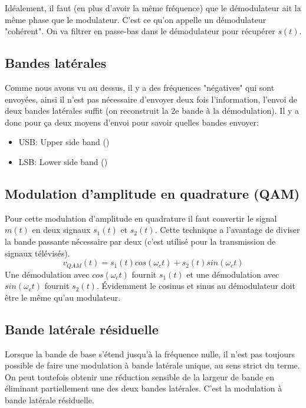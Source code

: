 Idéalement, il faut (en plus d'avoir la même fréquence) que le démodulateur ait la même phase que le modulateur. C'est ce qu'on appelle un démodulateur "cohérent". On va filtrer en passe-bas dans le démodulateur pour récupérer $s(t)$.

\subsection{Bandes latérales}

Comme nous avons vu au dessus, il y a des fréquences "négatives" qui sont envoyées, ainsi il n'est pas nécessaire d'envoyer deux fois l'information, l'envoi de deux bandes latérales suffit (on reconstruit la 2e bande à la démodulation). Il y a donc pour ça deux moyens d'envoi pour savoir quelles bandes envoyer:
\begin{itemize}
  \item USB: Upper side band ()
  \item LSB: Lower side band ()
\end{itemize}

\subsection{Modulation d'amplitude en q\-uadrature (QAM)}

Pour cette modulation d'amplitude en quadrature il faut convertir le signal $m(t)$ en deux signaux $s_1(t)$ et $s_2(t)$. Cette technique a l'avantage de diviser la bande passante nécessaire par deux (c'est utilisé pour la transmission de signaux télévisés).
\begin{equation*}
v_{QAM}(t) = s_1(t) cos(\omega_c t) + s_2(t) sin(\omega_c t)
\end{equation*}
Une démodulation avec $cos(\omega_c t)$ fournit $s_1(t)$ et une démodulation avec $sin(\omega_c t)$ fournit $s_2(t)$. Évidemment le cosinus et sinus au démodulateur doit être le même qu'au modulateur.

\subsection{Bande latérale résiduelle}

Lorsque la bande de base s'étend jusqu'à la fréquence nulle, il n'est pas toujours possible de faire une modulation à bande latérale unique, au sens strict du terme. On peut toutefois obtenir une réduction sensible de la largeur de bande en éliminant partiellement une des deux bandes latérales. C'est la modulation à bande latérale résiduelle.

